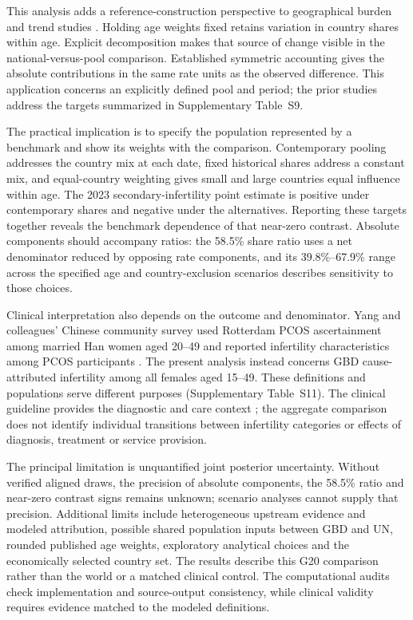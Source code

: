 \documentclass[11pt,a4paper]{article}
\begin{document}
This analysis adds a reference-construction perspective to geographical burden and trend studies \citep{liu_pcos2024,liang_burden2025,liang_trend2026}. Holding age weights fixed retains variation in country shares within age. Explicit decomposition makes that source of change visible in the national-versus-pool comparison. Established symmetric accounting gives the absolute contributions in the same rate units as the observed difference. This application concerns an explicitly defined pool and period; the prior studies address the targets summarized in Supplementary Table~S9.

The practical implication is to specify the population represented by a benchmark and show its weights with the comparison. Contemporary pooling addresses the country mix at each date, fixed historical shares address a constant mix, and equal-country weighting gives small and large countries equal influence within age. The 2023 secondary-infertility point estimate is positive under contemporary shares and negative under the alternatives. Reporting these targets together reveals the benchmark dependence of that near-zero contrast. Absolute components should accompany ratios: the 58.5\% share ratio uses a net denominator reduced by opposing rate components, and its 39.8\%--67.9\% range across the specified age and country-exclusion scenarios describes sensitivity to those choices.

Clinical interpretation also depends on the outcome and denominator. Yang and colleagues' Chinese community survey used Rotterdam PCOS ascertainment among married Han women aged 20--49 and reported infertility characteristics among PCOS participants \citep{yang}. The present analysis instead concerns GBD cause-attributed infertility among all females aged 15--49. These definitions and populations serve different purposes (Supplementary Table~S11). The clinical guideline provides the diagnostic and care context \citep{pcos}; the aggregate comparison does not identify individual transitions between infertility categories or effects of diagnosis, treatment or service provision.

The principal limitation is unquantified joint posterior uncertainty. Without verified aligned draws, the precision of absolute components, the 58.5\% ratio and near-zero contrast signs remains unknown; scenario analyses cannot supply that precision. Additional limits include heterogeneous upstream evidence and modeled attribution, possible shared population inputs between GBD and UN, rounded published age weights, exploratory analytical choices and the economically selected country set. The results describe this G20 comparison rather than the world or a matched clinical control. The computational audits check implementation and source-output consistency, while clinical validity requires evidence matched to the modeled definitions.
\end{document}

